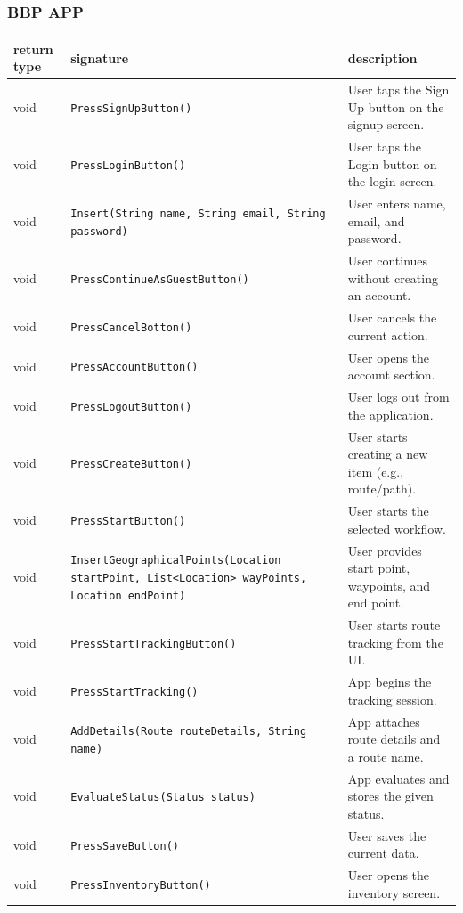 \subsubsection{BBP APP}
\begin{table}[H]
\centering
\begin{tabularx}{\textwidth}{|L{3cm}|L{6.5cm}|Y|}
\hline
\textbf{return type} & \textbf{signature} & \textbf{description} \\
\hline
void & \texttt{PressSignUpButton()} & User taps the Sign Up button on the signup screen. \\
\hline
void & \texttt{PressLoginButton()} & User taps the Login button on the login screen. \\
\hline
void & \texttt{Insert(String name, String email, String password)} & User enters name, email, and password. \\
\hline
void & \texttt{PressContinueAsGuestButton()} & User continues without creating an account. \\
\hline
void & \texttt{PressCancelBotton()} & User cancels the current action. \\
\hline
void & \texttt{PressAccountButton()} & User opens the account section. \\
\hline
void & \texttt{PressLogoutButton()} & User logs out from the application. \\
\hline
void & \texttt{PressCreateButton()} & User starts creating a new item (e.g., route/path). \\
\hline
void & \texttt{PressStartButton()} & User starts the selected workflow. \\
\hline
void & \texttt{InsertGeographicalPoints(Location startPoint, List<Location> wayPoints, Location endPoint)} & User provides start point, waypoints, and end point. \\
\hline
void & \texttt{PressStartTrackingButton()} & User starts route tracking from the UI. \\
\hline
void & \texttt{PressStartTracking()} & App begins the tracking session. \\
\hline
void & \texttt{AddDetails(Route routeDetails, String name)} & App attaches route details and a route name. \\
\hline
void & \texttt{EvaluateStatus(Status status)} & App evaluates and stores the given status. \\
\hline
void & \texttt{PressSaveButton()} & User saves the current data. \\
\hline
void & \texttt{PressInventoryButton()} & User opens the inventory screen. \\

\end{tabularx}
\end{table}

